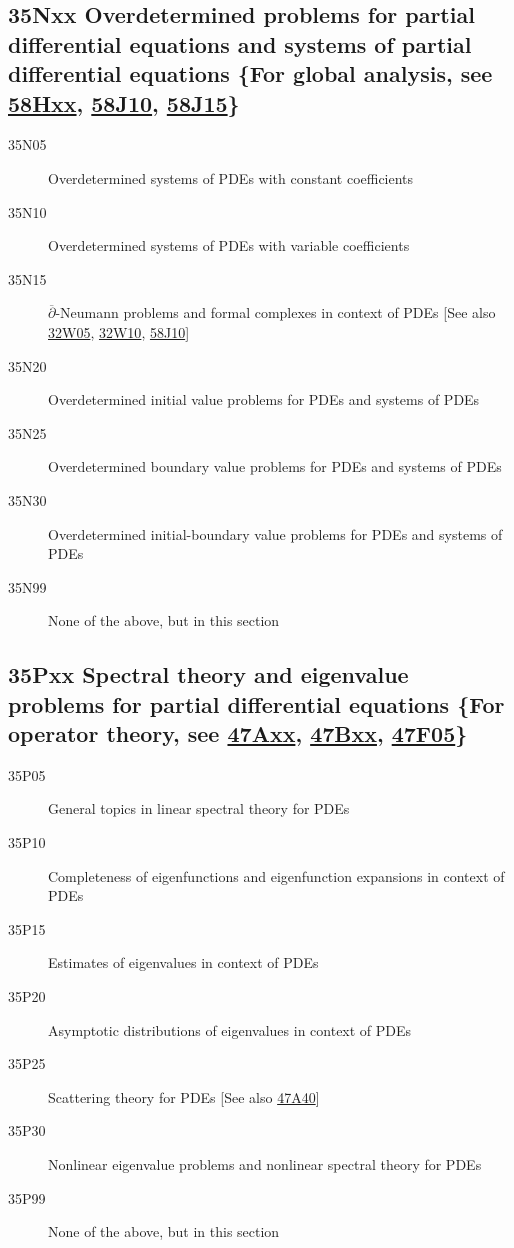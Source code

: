 \documentclass[letterpaper]{article}
\begin{document}
\subsection*{35Nxx  Overdetermined problems for partial differential equations and systems of partial differential equations \{For global analysis, see \hyperref[58Hxx]{58Hxx}, \hyperref[58J10]{58J10}, \hyperref[58J15]{58J15}\} }\label{35Nxx}
\begin{description}  
\item [35N05]\label{35N05} Overdetermined systems of PDEs with constant coefficients
\item [35N10]\label{35N10} Overdetermined systems of PDEs with variable coefficients
\item [35N15]\label{35N15} $\overline\partial$-Neumann problems  and formal complexes in context of PDEs [See also \hyperref[32W05]{32W05}, \hyperref[32W10]{32W10}, \hyperref[58J10]{58J10}]
\item [35N20]\label{35N20} Overdetermined initial value problems for PDEs and systems of PDEs
\item [35N25]\label{35N25} Overdetermined boundary value problems for PDEs and systems of PDEs
\item [35N30]\label{35N30} Overdetermined initial-boundary value problems for PDEs and systems of PDEs
\item [35N99]\label{35N99} None of the above, but in this section
\end{description}
\subsection*{35Pxx  Spectral theory and eigenvalue problems for partial differential equations \{For operator theory, see \hyperref[47Axx]{47Axx}, \hyperref[47Bxx]{47Bxx}, \hyperref[47F05]{47F05}\} }\label{35Pxx}
\begin{description}  
\item [35P05]\label{35P05} General topics in linear spectral theory for PDEs
\item [35P10]\label{35P10} Completeness of eigenfunctions and eigenfunction expansions in context of  PDEs
\item [35P15]\label{35P15} Estimates of  eigenvalues in context of PDEs
\item [35P20]\label{35P20} Asymptotic distributions of eigenvalues in context of PDEs
\item [35P25]\label{35P25} Scattering theory for PDEs [See also \hyperref[47A40]{47A40}]
\item [35P30]\label{35P30} Nonlinear eigenvalue problems and nonlinear spectral theory for PDEs
\item [35P99]\label{35P99} None of the above, but in this section
\end{description}
\end{document}

